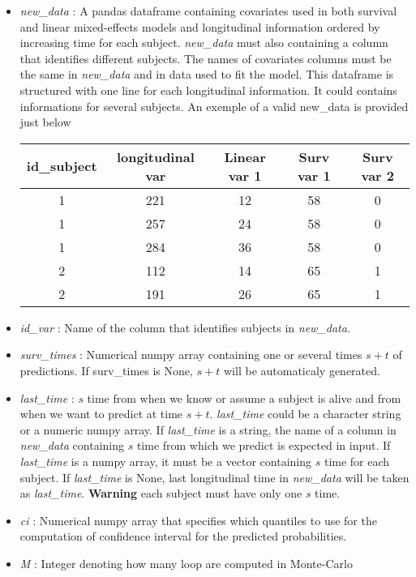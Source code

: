 \documentclass[11pt, oneside]{article}   	%
\begin{document}
\begin{itemize}
\item
  \emph{new\_data} : A pandas dataframe containing covariates
  used in both survival and linear mixed-effects models and longitudinal
  information ordered by increasing time for each subject.
  \emph{new\_data} must also containing a column that identifies different
  subjects. The names of covariates columns must be the same in
  \emph{new\_data} and in data used to fit the model. This dataframe is
  structured with one line for each longitudinal information. It could
  contains informations for several subjects. An exemple of a valid
  new\_data is provided just below

\begin{tabular}{|c|c|c|c|c|}
  \hline
  id\_subject & longitudinal var & Linear var 1 & Surv var 1 & Surv var 2 \\
   \hline
  1 & 221 & 12 & 58 & 0 \\
  1 & 257 & 24 & 58 & 0 \\
  1 & 284 & 36 & 58 & 0 \\
  2 & 112 & 14 & 65 & 1 \\
  2 & 191 & 26 & 65 & 1 \\
   \hline
\end{tabular}
\item
  \emph{id\_var} : Name of the column that identifies subjects in
  \emph{new\_data}.
\item
  \emph{surv\_times} : Numerical numpy array containing one or several times \(s+t\) of
  predictions. If surv\_times is None, \(s+t\) will be automaticaly generated.
\item
  \emph{last\_time} : \(s\) time from when we know or assume a subject
  is alive and from when we want to predict at time \(s+t\).
  \emph{last\_time} could be a character string or a numeric numpy
  array. If \emph{last\_time} is a string, the name of a column in
  \emph{new\_data} containing \(s\) time from which we predict is expected in input. If
  \emph{last\_time} is a numpy array, it must be a vector containing \(s\)
  time for each subject. If \emph{last\_time} is None, last longitudinal
  time in \emph{new\_data} will be taken as \emph{last\_time}.
  \textbf{Warning} each subject must have only one \(s\) time.
\item
  \emph{ci} : Numerical numpy array that specifies which quantiles to
  use for the computation of confidence interval for the predicted
  probabilities.
\item
  \emph{M} : Integer denoting how many loop are computed in Monte-Carlo

\end{itemize}
\end{document}
